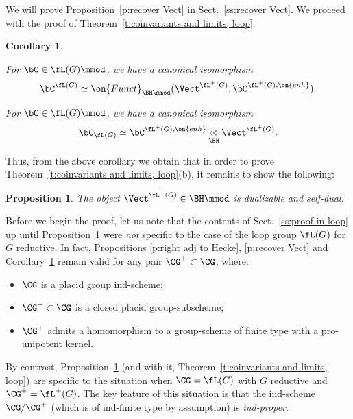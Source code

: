 \documentclass[9pt]{amsart}
\newtheorem{cor}[subsubsection]{Corollary}
\newtheorem{prop}[subsubsection]{Proposition}
\theoremstyle{definition}
\theoremstyle{remark}
\newcommand{\thmref}[1]{Theorem~\ref{#1}}
\newcommand{\secref}[1]{Sect.~\ref{#1}}
\newcommand{\propref}[1]{Proposition~\ref{#1}}
\newcommand{\corref}[1]{Corollary~\ref{#1}}
\numberwithin{equation}{section}
\begin{document}
We will prove \propref{p:recover Vect} in \secref{ss:recover Vect}. We proceed with the proof of \thmref{t:coinvariants and limits, loop}. 

\begin{cor} \label{c:inv via Hecke} \hfill

\smallskip

For $\bC\in \fL(G)\mmod$, we have a canonical isomorphism
$$\bC^{\fL(G)}\simeq \on{Funct}_{\BH\mmod}(\Vect^{\fL^+(G)},\bC^{\fL^+(G),\on{enh}}).$$

\smallskip

For $\bC\in \fL(G)\mmod$, we have a canonical isomorphism
$$\bC_{\fL(G)}\simeq \bC^{\fL^+(G),\on{enh}}\underset{\BH}\otimes \Vect^{\fL^+(G)}.$$

\end{cor}

Thus, from the above corollary we obtain that in order to prove \thmref{t:coinvariants and limits, loop}(b),
it remains to show the following:

\begin{prop}  \label{p:inv dualizable}
The object $\Vect^{\fL^+(G)}\in \BH\mmod$ is dualizable and self-dual.
\end{prop} 


\ssec{Proof of \propref{p:inv dualizable}}

\sssec{}

Before we begin the proof, let us note that the contents of \secref{ss:proof in loop} up until
\propref{p:inv dualizable} were \emph{not} specific to the case of the loop group $\fL(G)$
for $G$ reductive. In fact, Propositions \ref{p:right adj to Hecke}, \ref{p:recover Vect} and 
\corref{c:inv via Hecke} remain valid for any pair $\CG^+\subset \CG$, where:

\begin{itemize}

\item $\CG$ is a placid group ind-scheme;

\item $\CG^+\subset \CG$ is a closed placid group-subscheme;

\item $\CG^+$ admits a homomorphism to a group-scheme of finite type with a pro-unipotent kernel.

\end{itemize}

By contrast, \propref{p:inv dualizable} (and with it, \thmref{t:coinvariants and limits, loop}) are specific to the
situation when $\CG=\fL(G)$ with $G$ reductive and $\CG^+=\fL^+(G)$. The key feature of this situation is that
the ind-scheme $\CG/\CG^+$ (which is of ind-finite type by assumption) is \emph{ind-proper}. 
\end{document}
